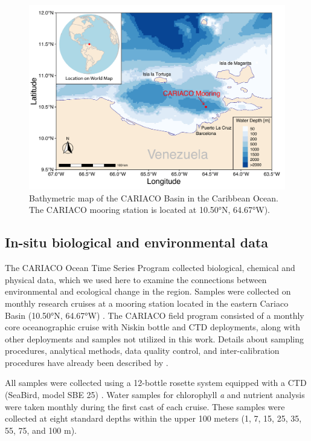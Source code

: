 \documentclass[draft]{agujournal2019}
\begin{document}
\begin{figure}
\noindent\includegraphics[width=\textwidth]{fig/Map_CAR.pdf}
\caption{Bathymetric map of the CARIACO Basin in the Caribbean Ocean. The CARIACO mooring station is located at \ang{10.50}N, \ang{64.67}W).}
\label{fig:map}
\end{figure}


\subsection{In-situ biological and environmental data}
    The CARIACO Ocean Time Series Program collected biological, chemical and physical data, which we used here to examine the connections between environmental and ecological change in the region. Samples were collected on monthly research cruises at a mooring station located in the eastern Cariaco Basin (\ang{10.50}N, \ang{64.67}W) \cite{muller-karger_scientific_2019}.
    The CARIACO field program consisted of a monthly core oceanographic cruise with Niskin bottle and CTD deployments, along with other deployments and samples not utilized in this work. Details about sampling procedures, analytical methods, data quality control, and inter-calibration procedures have already been described by . 
    
    All samples were collected using a 12-bottle rosette system equipped with a CTD (SeaBird, model SBE 25) \cite{astor_yrene_m_handbook_2013}. Water samples for chlorophyll \textit{a} and nutrient analysis were taken monthly during the first cast of each cruise. These samples were collected at eight standard depths within the upper 100 meters (1, 7, 15, 25, 35, 55, 75, and 100 m). 
\end{document}
